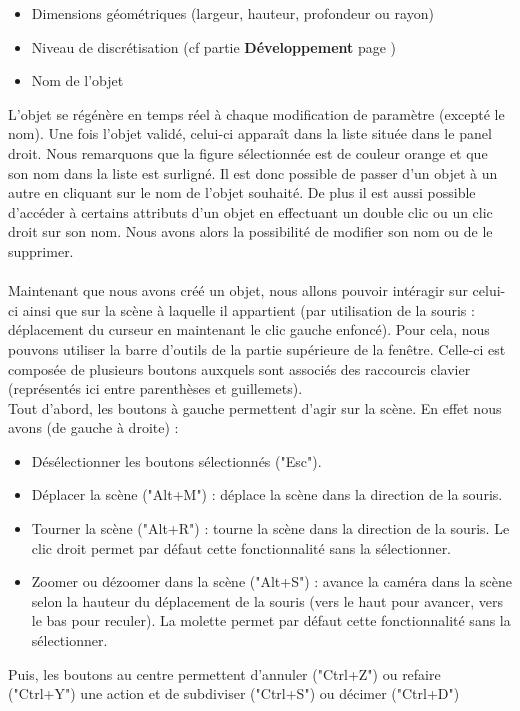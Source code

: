 \documentclass[a4paper]{memoir}
\begin{document}
			\begin{itemize}
				\item Dimensions géométriques (largeur, hauteur, profondeur ou rayon)
				\item Niveau de discrétisation (cf partie \textbf{Développement} page \pageref{mesh-dev})
				\item Nom de l'objet
			\end{itemize}
			L'objet se régénère en temps réel à chaque modification de paramètre (excepté le nom). Une fois l'objet validé, celui-ci apparaît dans la liste 
			située dans le panel droit. Nous remarquons que la figure sélectionnée est de couleur orange et que son nom dans la liste est surligné. Il est 
			donc possible de passer d'un objet à un autre en cliquant sur le nom de l'objet souhaité. De plus il est aussi possible d'accéder à certains 
			attributs d'un objet en effectuant un double clic ou un clic droit sur son nom. Nous avons alors la possibilité de modifier son nom ou de le 
			supprimer.\\\\ 
			Maintenant que nous avons créé un objet, nous allons pouvoir intéragir sur celui-ci ainsi que sur la scène à laquelle il appartient (par 
			utilisation de la souris : déplacement du curseur en maintenant le clic gauche enfoncé). Pour cela, nous pouvons utiliser la barre d'outils de 
			la partie supérieure de la fenêtre. Celle-ci est composée de plusieurs boutons auxquels sont associés des raccourcis clavier (représentés ici 
			entre parenthèses et guillemets).\\
			Tout d'abord, les boutons à gauche permettent d'agir sur la  scène. En effet nous avons (de gauche à droite) : 
			\begin{itemize}
				\item Désélectionner les boutons sélectionnés ("Esc").
				\item Déplacer la scène ("Alt+M") : déplace la scène dans la direction de la souris.
				\item Tourner la scène ("Alt+R") : tourne la scène dans la direction de la souris. Le clic droit permet par défaut cette fonctionnalité sans 
				la sélectionner.
				\item Zoomer ou dézoomer dans la scène ("Alt+S") : avance la caméra dans la scène selon la hauteur du déplacement de la souris (vers le haut 
				pour avancer, vers le bas pour reculer). La molette permet par défaut cette fonctionnalité sans la sélectionner.
			\end{itemize}
			Puis, les boutons au centre permettent d'annuler ("Ctrl+Z") ou refaire ("Ctrl+Y") une action et de subdiviser ("Ctrl+S") ou décimer ("Ctrl+D") 
\end{document}
